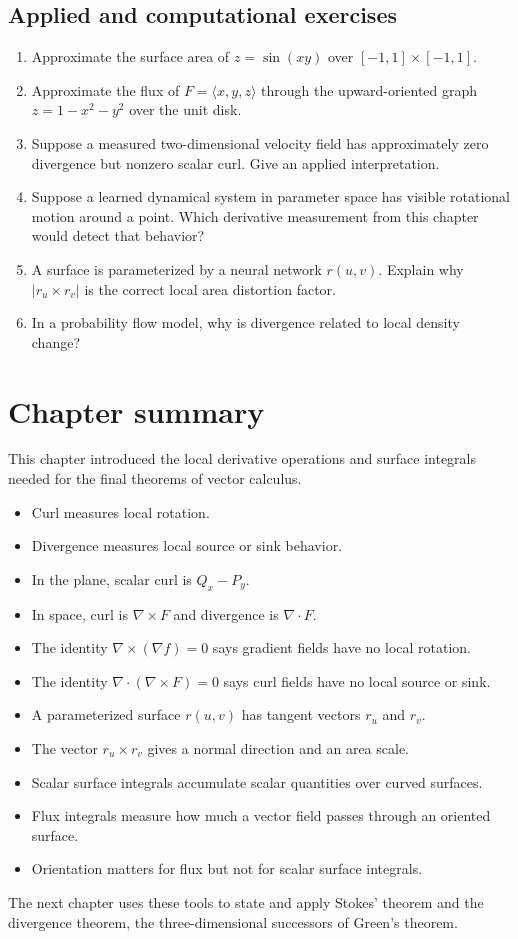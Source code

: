 \documentclass[11pt]{article}
\newcommand{\grad}{\nabla}
\begin{document}
\subsection*{Applied and computational exercises}
\begin{enumerate}[start=19]
  \item Approximate the surface area of $z=\sin(xy)$ over $[-1,1]\times[-1,1]$.
  \item Approximate the flux of $F=\langle x,y,z\rangle$ through the upward-oriented graph $z=1-x^2-y^2$ over the unit disk.
  \item Suppose a measured two-dimensional velocity field has approximately zero divergence but nonzero scalar curl. Give an applied interpretation.
  \item Suppose a learned dynamical system in parameter space has visible rotational motion around a point. Which derivative measurement from this chapter would detect that behavior?
  \item A surface is parameterized by a neural network $r(u,v)$. Explain why $|r_u\times r_v|$ is the correct local area distortion factor.
  \item In a probability flow model, why is divergence related to local density change?
\end{enumerate}

\section{Chapter summary}

This chapter introduced the local derivative operations and surface integrals needed for the final theorems of vector calculus.
\begin{itemize}
  \item Curl measures local rotation.
  \item Divergence measures local source or sink behavior.
  \item In the plane, scalar curl is $Q_x-P_y$.
  \item In space, curl is $\grad\times F$ and divergence is $\grad\cdot F$.
  \item The identity $\grad\times(\grad f)=0$ says gradient fields have no local rotation.
  \item The identity $\grad\cdot(\grad\times F)=0$ says curl fields have no local source or sink.
  \item A parameterized surface $r(u,v)$ has tangent vectors $r_u$ and $r_v$.
  \item The vector $r_u\times r_v$ gives a normal direction and an area scale.
  \item Scalar surface integrals accumulate scalar quantities over curved surfaces.
  \item Flux integrals measure how much a vector field passes through an oriented surface.
  \item Orientation matters for flux but not for scalar surface integrals.
\end{itemize}

The next chapter uses these tools to state and apply Stokes' theorem and the divergence theorem, the three-dimensional successors of Green's theorem.
\end{document}
